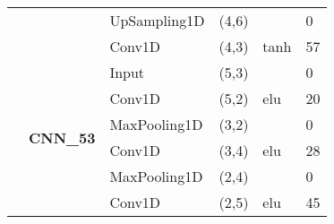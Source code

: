 \begin{table}[H]
\begin{center}
\begin{tabular}{ll|l|l|l|l|}
\multicolumn{1}{|l|}{}                                                                  &                                   & UpSampling1D                       & (4,6)                                &                                          & 0                                           \\ \cline{3-6} 
\multicolumn{1}{|l|}{}                                                                  &                                   & Conv1D                             & (4,3)                                & tanh                                     & 57                                          \\ \cline{2-6} 
\multicolumn{1}{|l|}{}                                                                  & \multirow{8}{*}{\textbf{CNN\_53}} & Input                              & (5,3)                                &                                          & 0                                           \\ \cline{3-6} 
\multicolumn{1}{|l|}{}                                                                  &                                   & Conv1D                             & (5,2)                                & elu                                     & 20                                          \\ \cline{3-6} 
\multicolumn{1}{|l|}{}                                                                  &                                   & MaxPooling1D                       & (3,2)                                &                                          & 0                                           \\ \cline{3-6} 
\multicolumn{1}{|l|}{}                                                                  &                                   & Conv1D                             & (3,4)                                & elu                                     & 28                                          \\ \cline{3-6} 
\multicolumn{1}{|l|}{}                                                                  &                                   & MaxPooling1D                       & (2,4)                                &                                          & 0                                           \\ \cline{3-6} 
\multicolumn{1}{|l|}{}                                                                  &                                   & Conv1D                             & (2,5)                                & elu                                     & 45                                          \\ \cline{3-6} 

\end{tabular}
\end{center}
\end{table}
